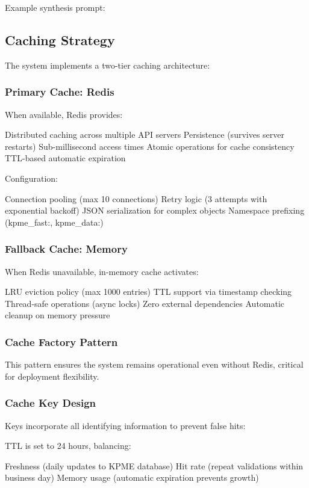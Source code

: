 \documentclass[conference]{IEEEtran}
\begin{document}
Example synthesis prompt:

\subsection{Caching Strategy}

The system implements a two-tier caching architecture:

\subsubsection{Primary Cache: Redis}

When available, Redis provides:

Distributed caching across multiple API servers
Persistence (survives server restarts)
Sub-millisecond access times
Atomic operations for cache consistency
TTL-based automatic expiration

Configuration:

Connection pooling (max 10 connections)
Retry logic (3 attempts with exponential backoff)
JSON serialization for complex objects
Namespace prefixing (kpme\_fast:, kpme\_data:)

\subsubsection{Fallback Cache: Memory}

When Redis unavailable, in-memory cache activates:

LRU eviction policy (max 1000 entries)
TTL support via timestamp checking
Thread-safe operations (async locks)
Zero external dependencies
Automatic cleanup on memory pressure

\subsubsection{Cache Factory Pattern}

This pattern ensures the system remains operational even without Redis, critical for deployment flexibility.

\subsubsection{Cache Key Design}

Keys incorporate all identifying information to prevent false hits:

TTL is set to 24 hours, balancing:

Freshness (daily updates to KPME database)
Hit rate (repeat validations within business day)
Memory usage (automatic expiration prevents growth)
\end{document}
